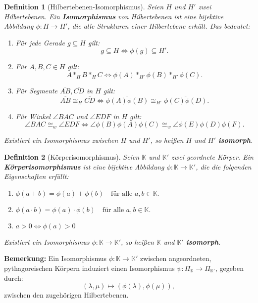 \documentclass[a4paper,12pt]{article}
\theoremstyle{break}
\newtheorem{definition}{Definition}[section]
\begin{document}
\begin{definition}[Hilbertebenen-Isomorphismus]
Seien \(H\) und \(H'\) zwei Hilbertebenen. Ein \textbf{Isomorphismus} von Hilbertebenen ist eine bijektive Abbildung \(\phi: H \to H'\), die alle Strukturen einer Hilbertebene erhält. Das bedeutet:
\begin{enumerate}
    \item Für jede Gerade \(g \subseteq H\) gilt:
    \[
    g \subseteq H \iff \phi(g) \subseteq H'.
    \]
    \item Für \(A, B, C \in H\) gilt:
    \[
    A *_H B *_H C \iff \phi(A) *_{H'} \phi(B) *_{H'} \phi(C).
    \]
    \item Für Segmente \(\overline{AB}, \overline{CD}\) in \(H\) gilt:
    \[
    \overline{AB} \cong_H \overline{CD} \iff \overline{\phi(A)\phi(B)} \cong_{H'} \overline{\phi(C)\phi(D)}.
    \]
    \item Für Winkel \(\angle BAC\) und \(\angle EDF\) in \(H\) gilt:
    \[
    \angle BAC \cong_w \angle EDF \iff \angle \phi(B)\phi(A)\phi(C) \cong_w \angle \phi(E)\phi(D)\phi(F).
    \]
\end{enumerate}

Existiert ein Isomorphismus zwischen \(H\) und \(H'\), so heißen \(H\) und \(H'\) \textbf{isomorph}.
\end{definition}

\begin{definition}[Körperisomorphismus]
Seien \(\mathbb{K}\) und \(\mathbb{K}'\) zwei geordnete Körper. Ein \textbf{Körperisomorphismus} ist eine bijektive Abbildung \(\phi: \mathbb{K} \to \mathbb{K}'\), die die folgenden Eigenschaften erfüllt:
\begin{enumerate}
    \item \(\phi(a + b) = \phi(a) + \phi(b) \quad \text{für alle } a, b \in \mathbb{K}.\)
    \item \(\phi(a \cdot b) = \phi(a) \cdot \phi(b) \quad \text{für alle } a, b \in \mathbb{K}.\)
    \item \(a>0 \iff \phi(a) > 0\)
\end{enumerate}

Existiert ein Isomorphismus \(\phi: \mathbb{K} \to \mathbb{K}'\), so heißen \(\mathbb{K}\) und \(\mathbb{K}'\) \textbf{isomorph}.
\end{definition}

\textbf{Bemerkung:}
Ein Isomorphismus \(\phi: \mathbb{K} \to \mathbb{K}'\) zwischen angeordneten, pythagoreischen Körpern induziert einen Isomorphismus \(\psi: \Pi_\mathbb{K} \to \Pi_{\mathbb{K}'}\), gegeben durch:
\[
(\lambda, \mu) \mapsto (\phi(\lambda), \phi(\mu)),
\]
zwischen den zugehörigen Hilbertebenen.
\end{document}
